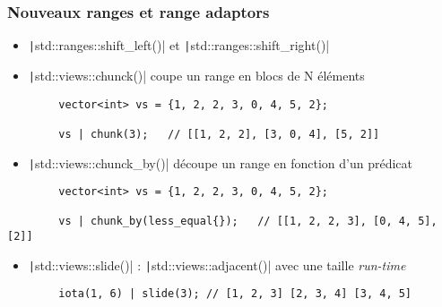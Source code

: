 \documentclass[C++.tex]{subfiles}
\begin{document}
\begin{frame}[fragile]
	\frametitle{Nouveaux ranges et range adaptors}
	\begin{itemize}
		\item \texttt|std::ranges::shift_left()| et \texttt|std::ranges::shift_right()|
		\item \texttt|std::views::chunck()| coupe un range en blocs de N éléments
	\end{itemize}

	\begin{verbatim}
		vector<int> vs = {1, 2, 2, 3, 0, 4, 5, 2};

		vs | chunk(3);   // [[1, 2, 2], [3, 0, 4], [5, 2]]
	\end{verbatim}

	\begin{itemize}
		\item \texttt|std::views::chunck_by()| découpe un range en fonction d'un prédicat
	\end{itemize}

	\begin{verbatim}
		vector<int> vs = {1, 2, 2, 3, 0, 4, 5, 2};

		vs | chunk_by(less_equal{});   // [[1, 2, 2, 3], [0, 4, 5], [2]]
	\end{verbatim}

	\begin{itemize}
		\item \texttt|std::views::slide()| : \texttt|std::views::adjacent()| avec une taille \textit{run-time}
	\end{itemize}

	\begin{verbatim}
		iota(1, 6) | slide(3); // [1, 2, 3] [2, 3, 4] [3, 4, 5]
	\end{verbatim}

	\begin{codesample}
		\sample{https://godbolt.org/#g:!((g:!((g:!((h:codeEditor,i:(filename:'1',fontScale:14,fontUsePx:'0',j:1,lang:c%

}
\end{codesample}
\end{frame}
\end{document}
